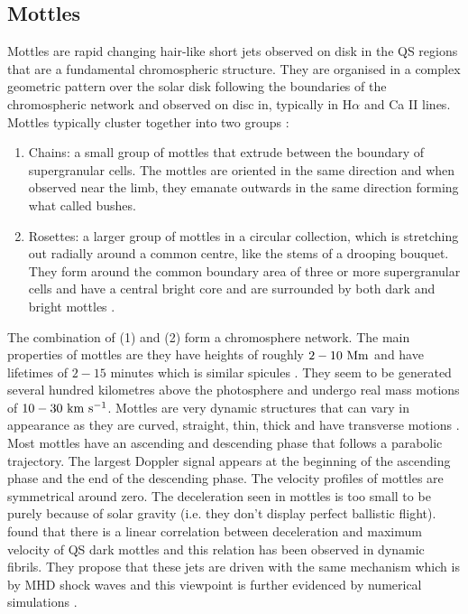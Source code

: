 \documentclass[12pt]{ociamthesis}
\newcommand{\kms}{~\rm{km ~s^{-1}}}
\newcommand{\np}{\\ \\}
\begin{document}
\subsection{Mottles}
\label{subsec:mots}
Mottles are rapid changing hair-like short jets observed on disk in the QS regions that are a fundamental chromospheric structure. They are organised in a complex geometric pattern over the solar disk following the boundaries of the chromospheric network and observed on disc in, typically in H$\alpha$ and Ca II lines. Mottles typically cluster together into two groups \citep{Beckers1963ApJ138648B}:
\begin{enumerate}
\item Chains: a small group of mottles that extrude between the boundary of supergranular cells. The mottles are oriented in the same direction and when observed near the limb, they emanate outwards in the same direction forming what \cite{Cragg1963ApJ138303C} called bushes.
\item Rosettes: a larger group of mottles in a circular collection, which is stretching out radially around a common centre, like the stems of a drooping bouquet. They form around the common boundary area of three or more supergranular cells and have a central bright core and are surrounded by both dark and bright mottles \cite{Tsiropoula2012}.    
\end{enumerate}
The combination of (1) and (2) form a chromosphere network. The main properties of mottles are they have heights of roughly $2-10~\rm{Mm}$ and have lifetimes of $2-15$ minutes which is similar spicules \citep{Suematsu1995ApJ}. They seem to be generated several hundred kilometres above the photosphere and undergo real mass motions of $10-30\kms$. Mottles are very dynamic structures that can vary in appearance as they are curved, straight, thin, thick and have transverse motions \citep{De_Pontieu2007ApJ}. Most mottles have an ascending and descending phase that follows a parabolic trajectory. The largest Doppler signal appears at the beginning of the ascending phase and the end of the descending phase. The velocity profiles of mottles are symmetrical around zero. The deceleration seen in mottles is too small to be purely because of solar gravity (i.e. they don't display perfect ballistic flight). \cite{Rouppe2007ApJ660L169R} found that there is a linear correlation between deceleration and maximum velocity of QS dark mottles and this relation has been observed in dynamic fibrils. They propose that these jets are driven with the same mechanism which is by MHD shock waves and this viewpoint is further evidenced by numerical simulations \citep{De_Pontieu2007ApJ, Hansteen2006ApJ}. \np
\end{document}
